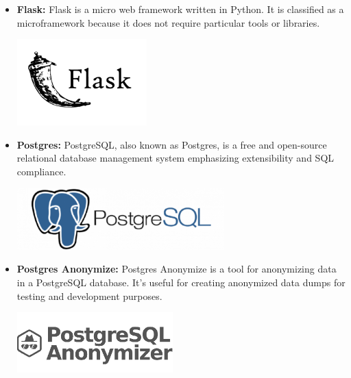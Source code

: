 \begin{itemize}
    \item \textbf{Flask:} \newline Flask is a micro web framework written in Python. It is classified as a microframework because it does not require particular tools or libraries. \newline \newline
          \begin{minipage}{\linewidth}
              \centering
              \includegraphics[width=5cm]{src/assets/logos/flask.png}
          \end{minipage}
    \item \textbf{Postgres:} \newline PostgreSQL, also known as Postgres, is a free and open-source relational database management system emphasizing extensibility and SQL compliance. \newline \newline
          \begin{minipage}{\linewidth}
              \centering
              \includegraphics[width=8cm]{src/assets/logos/postgresql.png}
          \end{minipage}
    \item \textbf{Postgres Anonymize:} \newline Postgres Anonymize is a tool for anonymizing data in a PostgreSQL database. It's useful for creating anonymized data dumps for testing and development purposes. \newline \newline
          \begin{minipage}{\linewidth}
              \centering
              \includegraphics[width=6cm]{src/assets/logos/postgresql_anonymizer.png}
          \end{minipage}
          \newpage


\end{itemize}
